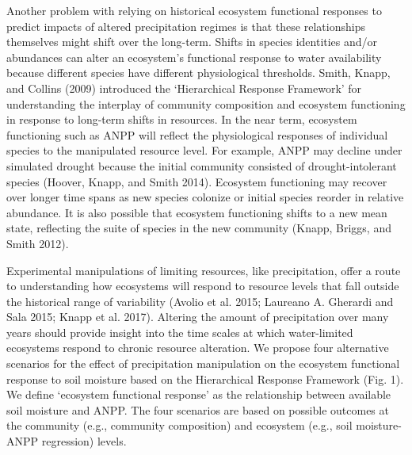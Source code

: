 \documentclass[fleqn,10pt,lineno]{wlpeerj} %
\begin{document}
Another problem with relying on historical ecosystem functional
responses to predict impacts of altered precipitation regimes is that
these relationships themselves might shift over the long-term. Shifts in
species identities and/or abundances can alter an ecosystem's functional
response to water availability because different species have different
physiological thresholds. Smith, Knapp, and Collins (2009) introduced
the `Hierarchical Response Framework' for understanding the interplay of
community composition and ecosystem functioning in response to long-term
shifts in resources. In the near term, ecosystem functioning such as
ANPP will reflect the physiological responses of individual species to
the manipulated resource level. For example, ANPP may decline under
simulated drought because the initial community consisted of
drought-intolerant species (Hoover, Knapp, and Smith 2014). Ecosystem
functioning may recover over longer time spans as new species colonize
or initial species reorder in relative abundance. It is also possible
that ecosystem functioning shifts to a new mean state, reflecting the
suite of species in the new community (Knapp, Briggs, and Smith 2012).

Experimental manipulations of limiting resources, like precipitation,
offer a route to understanding how ecosystems will respond to resource
levels that fall outside the historical range of variability (Avolio et
al. 2015; Laureano A. Gherardi and Sala 2015; Knapp et al. 2017).
Altering the amount of precipitation over many years should provide
insight into the time scales at which water-limited ecosystems respond
to chronic resource alteration. We propose four alternative scenarios
for the effect of precipitation manipulation on the ecosystem functional
response to soil moisture based on the Hierarchical Response Framework
(Fig. 1). We define `ecosystem functional response' as the relationship
between available soil moisture and ANPP. The four scenarios are based
on possible outcomes at the community (e.g., community composition) and
ecosystem (e.g., soil moisture-ANPP regression) levels.
\end{document}
